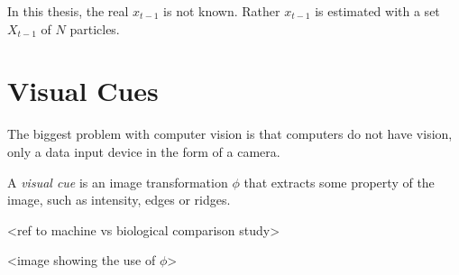 In this thesis, the real $x_{t-1}$ is not known. Rather $x_{t-1}$ is
estimated with a set $X_{t-1}$ of $N$ particles.

\section{Visual Cues}

The biggest problem with computer vision is that computers do not have
vision, only a data input device in the form of a camera.

A \emph{visual cue} is an image transformation $\phi$ that extracts
some property of the image, such as intensity, edges or ridges.

<ref to machine vs biological comparison study>

<image showing the use of $\phi$>

